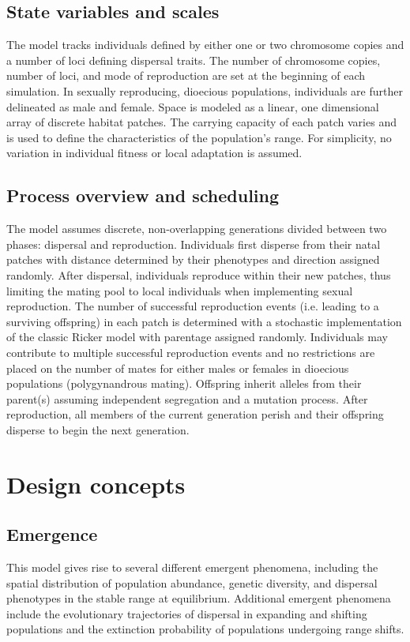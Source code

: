 \documentclass[11pt]{article}
\begin{document}
\subsection*{State variables and scales} 
The model tracks individuals defined by either one or two chromosome copies and a number of loci defining dispersal traits. The number of chromosome copies, number of loci, and mode of reproduction are set at the beginning of each simulation. In sexually reproducing, dioecious populations, individuals are further delineated as male and female. Space is modeled as a linear, one dimensional array of discrete habitat patches. The carrying capacity of each patch varies and is used to define the characteristics of the population's range. For simplicity, no variation in individual fitness or local adaptation is assumed.

\subsection*{Process overview and scheduling} 
The model assumes discrete, non-overlapping generations divided between two phases: dispersal and reproduction. Individuals first disperse from their natal patches with distance determined by their phenotypes and direction assigned randomly. After dispersal, individuals reproduce within their new patches, thus limiting the mating pool to local individuals when implementing sexual reproduction. The number of successful reproduction events (i.e. leading to a surviving offspring) in each patch is determined with a stochastic implementation of the classic Ricker model with parentage assigned randomly. Individuals may contribute to multiple successful reproduction events and no restrictions are placed on the number of mates for either males or females in dioecious populations (polygynandrous mating). Offspring inherit alleles from their parent(s) assuming independent segregation and a mutation process. After reproduction, all members of the current generation perish and their offspring disperse to begin the next generation.

\section*{Design concepts}
\subsection*{Emergence} 
This model gives rise to several different emergent phenomena, including the spatial distribution of population abundance, genetic diversity, and dispersal phenotypes in the stable range at equilibrium. Additional emergent phenomena include the evolutionary trajectories of dispersal in expanding and shifting populations and the extinction probability of populations undergoing range shifts.
\end{document}
